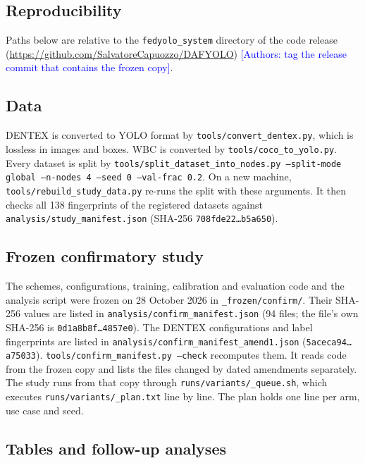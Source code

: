 \documentclass[pdflatex,sn-mathphys-num]{sn-jnl}
\newcommand{\authornote}[1]{\textcolor{blue}{[Authors: #1]}}
\begin{document}
\begin{appendices}

\section{Reproducibility}\label{app:repro}
Paths below are relative to the \texttt{fedyolo\_system} directory of the code release (\url{https://github.com/SalvatoreCapuozzo/DAFYOLO}) \authornote{tag the release commit that contains the frozen copy}.

\subsection{Data}
 DENTEX is converted to YOLO format by \texttt{tools/convert\_dentex.py}, which is lossless in images and boxes. WBC is converted by \texttt{tools/coco\_to\_yolo.py}. Every dataset is split by \texttt{tools/split\_dataset\_into\_nodes.py --split-mode global --n-nodes 4 --seed 0 --val-frac 0.2}. On a new machine, \texttt{tools/rebuild\_study\_data.py} re-runs the split with these arguments. It then checks all 138 fingerprints of the registered datasets against \texttt{analysis/study\_manifest.json} (SHA-256 \texttt{708fde22\ldots{}b5a650}).

\subsection{Frozen confirmatory study}
 The schemes, configurations, training, calibration and evaluation code and the analysis script were frozen on 28 October 2026 in \texttt{\_frozen/confirm/}. Their SHA-256 values are listed in \texttt{analysis/confirm\_manifest.json} (94 files; the file's own SHA-256 is \texttt{0d1a8b8f\ldots{}4857e0}). The DENTEX configurations and label fingerprints are listed in \texttt{analysis/confirm\_manifest\_amend1.json} (\texttt{5aceca94\ldots{}a75033}). \texttt{tools/confirm\_manifest.py --check} recomputes them. It reads code from the frozen copy and lists the files changed by dated amendments separately. The study runs from that copy through \texttt{runs/variants/\_queue.sh}, which executes \texttt{runs/variants/\_plan.txt} line by line. The plan holds one line per arm, use case and seed.

\subsection{Tables and follow-up analyses}


\end{appendices}
\end{document}
